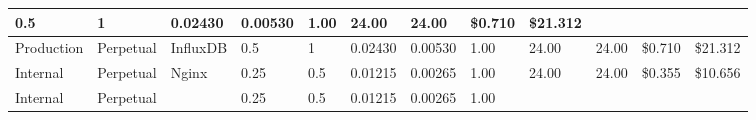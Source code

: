 \begin{landscape}
\begin{table}[!htbp]
\begin{tabular}{llllllllllll}
      \multicolumn{1}{l|}{\cellcolor[HTML]{FFEB84}0.5} &
      \multicolumn{1}{l|}{\cellcolor[HTML]{FFEB84}1} &
      \multicolumn{1}{l|}{\cellcolor[HTML]{FFEB84}0.02430} &
      \multicolumn{1}{l|}{\cellcolor[HTML]{63BE7B}0.00530} &
      \multicolumn{1}{l|}{\cellcolor[HTML]{FFEB84}1.00} &
      \multicolumn{1}{l|}{\cellcolor[HTML]{F8696B}24.00} &
      \multicolumn{1}{l|}{\cellcolor[HTML]{F8696B}24.00} &
      \multicolumn{1}{l|}{\cellcolor[HTML]{F8696B}\$0.710} &
      \multicolumn{1}{l|}{\cellcolor[HTML]{F8696B}\$21.312} \\ \hline
    \multicolumn{1}{|l|}{\cellcolor[HTML]{EFC321}Production} &
      \multicolumn{1}{l|}{\cellcolor[HTML]{C6E0B4}Perpetual} &
      \multicolumn{1}{l|}{\cellcolor[HTML]{20A4EA}InfluxDB} &
      \multicolumn{1}{l|}{\cellcolor[HTML]{FFEB84}0.5} &
      \multicolumn{1}{l|}{\cellcolor[HTML]{FFEB84}1} &
      \multicolumn{1}{l|}{\cellcolor[HTML]{FFEB84}0.02430} &
      \multicolumn{1}{l|}{\cellcolor[HTML]{63BE7B}0.00530} &
      \multicolumn{1}{l|}{\cellcolor[HTML]{FFEB84}1.00} &
      \multicolumn{1}{l|}{\cellcolor[HTML]{F8696B}24.00} &
      \multicolumn{1}{l|}{\cellcolor[HTML]{F8696B}24.00} &
      \multicolumn{1}{l|}{\cellcolor[HTML]{F8696B}\$0.710} &
      \multicolumn{1}{l|}{\cellcolor[HTML]{F8696B}\$21.312} \\ \hline
    \multicolumn{1}{|l|}{\cellcolor[HTML]{92D050}Internal} &
      \multicolumn{1}{l|}{\cellcolor[HTML]{C6E0B4}Perpetual} &
      \multicolumn{1}{l|}{\cellcolor[HTML]{D3FC04}Nginx} &
      \multicolumn{1}{l|}{\cellcolor[HTML]{F8696B}0.25} &
      \multicolumn{1}{l|}{\cellcolor[HTML]{F8696B}0.5} &
      \multicolumn{1}{l|}{\cellcolor[HTML]{63BE7B}0.01215} &
      \multicolumn{1}{l|}{\cellcolor[HTML]{63BE7B}0.00265} &
      \multicolumn{1}{l|}{\cellcolor[HTML]{FFEB84}1.00} &
      \multicolumn{1}{l|}{\cellcolor[HTML]{F8696B}24.00} &
      \multicolumn{1}{l|}{\cellcolor[HTML]{F8696B}24.00} &
      \multicolumn{1}{l|}{\cellcolor[HTML]{FFEB84}\$0.355} &
      \multicolumn{1}{l|}{\cellcolor[HTML]{FFEB84}\$10.656} \\ \hline
    \multicolumn{1}{|l|}{\cellcolor[HTML]{92D050}Internal} &
      \multicolumn{1}{l|}{\cellcolor[HTML]{C6E0B4}Perpetual} &
      \multicolumn{1}{l|}{\cellcolor[HTML]{31648C}{\color[HTML]{FFFFFF} PostgreSQL}} &
      \multicolumn{1}{l|}{\cellcolor[HTML]{F8696B}0.25} &
      \multicolumn{1}{l|}{\cellcolor[HTML]{F8696B}0.5} &
      \multicolumn{1}{l|}{\cellcolor[HTML]{63BE7B}0.01215} &
      \multicolumn{1}{l|}{\cellcolor[HTML]{63BE7B}0.00265} &
      \multicolumn{1}{l|}{\cellcolor[HTML]{FFEB84}1.00} &

\end{tabular}
\end{table}
\end{landscape}
